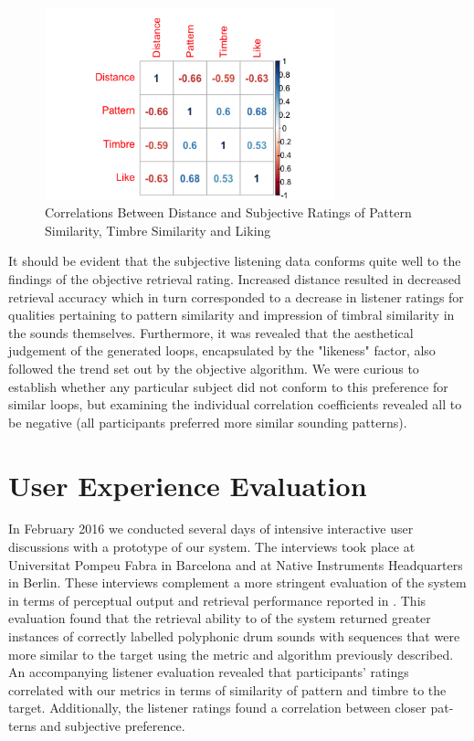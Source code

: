 \begin{figure}
	\begin{center}
		\includegraphics[width=0.75\textwidth]{ch07_evaluation/figures/correlation_matrix.png}
	\end{center}
	\caption[Correlations Between Distance and Subjective Ratings of Pattern Similarity, Timbre Similarity and Liking]{Correlations Between Distance and Subjective Ratings of Pattern Similarity, Timbre Similarity and Liking}
	\label{fig:correlation_matrix}
\end{figure}

It should be evident that the subjective listening data conforms quite well to the findings of the objective retrieval rating. Increased distance resulted in decreased retrieval accuracy which in turn corresponded to a decrease in listener ratings for qualities pertaining to pattern similarity and impression of timbral similarity in the sounds themselves. Furthermore, it was revealed that the aesthetical judgement of the generated loops, encapsulated by the "likeness" factor, also followed the trend set out by the objective algorithm. We were curious to establish whether any particular subject did not conform to this preference for similar loops, but examining the individual correlation coefficients revealed all to be negative (all participants preferred more similar sounding patterns).

\section{User Experience Evaluation}

In February 2016 we conducted several days of intensive interactive user discussions with a prototype of our system. The interviews took place at Universitat Pompeu Fabra in Barcelona and at Native Instruments Headquarters in Berlin. These interviews complement a more stringent evaluation of the system in terms of perceptual output and retrieval performance reported in \citep{Nuanain2016b}. This evaluation found that the retrieval ability to of the system returned greater instances of correctly labelled polyphonic drum sounds with sequences that were more similar to the target using the metric and algorithm previously described. An accompanying listener evaluation revealed that participants’ ratings correlated with our metrics in terms of similarity of pattern and timbre to the target. Additionally, the listener ratings found a correlation between closer pat- terns and subjective preference.

